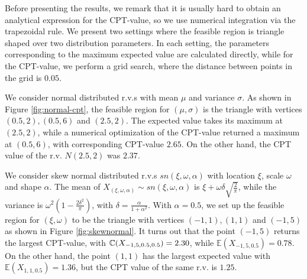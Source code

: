 Before presenting the results, we remark that it is usually hard to obtain an analytical expression for the CPT-value, so we use numerical integration via the trapezoidal rule. 
We present two settings where the feasible region is triangle shaped over two distribution parameters. In each setting, the parameters corresponding to the maximum expected value are calculated directly, while for the CPT-value, we perform a grid search, where the distance between points in the grid is $0.05$. 
\begin{example}
We consider normal distributed r.v.s with mean $\mu$ and variance $\sigma$. As shown in Figure \ref{fig:normal-cpt}, the feasible region for $(\mu, \sigma)$ is the triangle with vertices $(0.5,2), (0.5,6)$ and $(2.5,2)$. The expected value takes its maximum at $(2.5, 2)$, while a numerical optimization of the CPT-value returned a maximum at $(0.5, 6)$, with corresponding CPT-value $2.65$. On the other hand, the CPT value of the r.v. $N(2.5, 2)$ was $2.37$.
\end{example}

\begin{example}
We consider skew normal distributed r.v.s $sn(\xi, \omega, \alpha)$ with location $\xi$, scale $\omega$ and shape $\alpha$.  
The mean of $X_{(\xi, \omega, \alpha)} \sim sn(\xi, \omega, \alpha)$ is 
$\xi + \omega \delta \sqrt{\frac{2}{\pi}}$, while the  variance is
$\omega^2(1 - \frac{2\delta^2}{\pi})$, with $\delta = \frac{\alpha}{1 + \alpha^2}$.
With $\alpha=0.5$, we set up the feasible region for $(\xi, \omega)$ to be the triangle with vertices $(-1,1), (1,1)$ and $(-1,5)$ as shown in Figure \ref{fig:skewnormal}.  
It turns out that the point $(-1,5)$ returns the largest CPT-value, with $\mathbb{C}(X_{-1,5,0.5,0.5}) = 2.30$, while
$\mathbb{E}(X_{-1,5,0.5}) = 0.78$.
On the other hand, the point $(1,1)$ has the largest expected value with $\mathbb{E}(X_{1,1,0.5}) = 1.36$, but the CPT value of the same r.v. is $1.25$.
\end{example}


